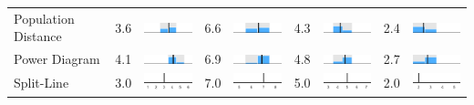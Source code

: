 \begin{table}
\begin{tabular}{l rm{7em} rm{7em} rm{7em} rm{7em}}
Population Distance    &   3.6 &       \includegraphics[width=7em]{mini_hist/WI_2004_dist_p} &   6.6 &       \includegraphics[width=7em]{mini_hist/WI_2008_dist_p} &   4.3 &       \includegraphics[width=7em]{mini_hist/WI_2012_dist_p} &   2.4 &       \includegraphics[width=7em]{mini_hist/WI_2016_dist_p} \\
Power Diagram          &   4.1 &        \includegraphics[width=7em]{mini_hist/WI_2004_power} &   6.9 &        \includegraphics[width=7em]{mini_hist/WI_2008_power} &   4.8 &        \includegraphics[width=7em]{mini_hist/WI_2012_power} &   2.7 &        \includegraphics[width=7em]{mini_hist/WI_2016_power} \\
Split-Line             &   3.0 &        \includegraphics[width=7em]{mini_hist/WI_2004_split_ax} &   7.0 &        \includegraphics[width=7em]{mini_hist/WI_2008_split_ax} &   5.0 &        \includegraphics[width=7em]{mini_hist/WI_2012_split_ax} &   2.0 &        \includegraphics[width=7em]{mini_hist/WI_2016_split_ax} \\

\end{tabular}
\end{table}
